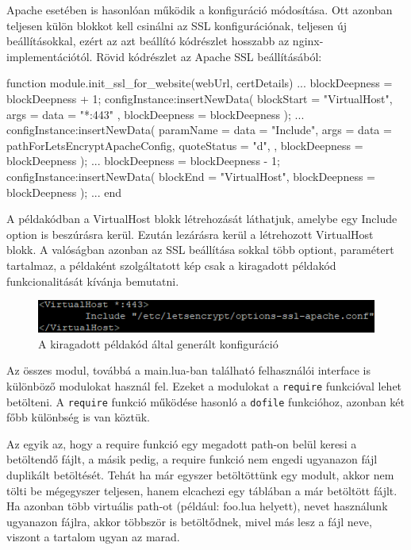 Apache esetében is hasonlóan működik a konfiguráció módosítása. Ott azonban teljesen külön blokkot kell csinálni az SSL konfigurációnak, teljesen új beállításokkal, ezért az azt beállító kódrészlet hosszabb az nginx-implementációtól. Rövid kódrészlet az Apache SSL beállításából:
\begin{lua}
function module.init_ssl_for_website(webUrl, certDetails)
...
	blockDeepness = blockDeepness + 1;
	configInstance:insertNewData({
		blockStart = "VirtualHost",
		args = {
			{data = "*:443"}
		},
		blockDeepness = blockDeepness
	});
	...
	configInstance:insertNewData({
		paramName = {data = "Include"},
		args = {
			{data = pathForLetsEncryptApacheConfig, quoteStatus = "d"},
		},
		blockDeepness = blockDeepness
	});
	...
	blockDeepness = blockDeepness - 1;
	configInstance:insertNewData({
		blockEnd = "VirtualHost",
		blockDeepness = blockDeepness
	});
...
end
\end{lua}

\pagebreak

A példakódban a VirtualHost blokk létrehozását láthatjuk, amelybe egy Include option is beszúrásra kerül. Ezután lezárásra kerül a létrehozott VirtualHost blokk. A valóságban azonban az SSL beállítása sokkal több optiont, paramétert tartalmaz, a példaként szolgáltatott kép csak a kiragadott példakód funkcionalitását kívánja bemutatni.
\begin{figure}[t]
\centering
\includegraphics[scale=1.0]{images/apache_config_edit_example.png}
\caption{A kiragadott példakód által generált konfiguráció}
\end{figure}


Az összes modul, továbbá a main.lua-ban található felhasználói interface is különböző modulokat használ fel. Ezeket a modulokat a \texttt{require} funkcióval lehet betölteni. A \texttt{require} funkció működése hasonló a \texttt{dofile} funkcióhoz, azonban két főbb különbség is van köztük. 

Az egyik az, hogy a require funkció egy megadott path-on belül keresi a betöltendő fájlt, a másik pedig, a require funkció nem engedi ugyanazon fájl duplikált betöltését. Tehát ha már egyszer betöltöttünk egy modult, akkor nem tölti be mégegyszer teljesen, hanem elcachezi egy táblában a már betöltött fájlt. Ha azonban több virtuális path-ot (például: \texttt{} foo.lua helyett), nevet használunk ugyanazon fájlra, akkor többször is betöltődnek, mivel más lesz a fájl neve, viszont a tartalom ugyan az marad. \cite{require}

